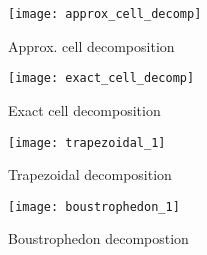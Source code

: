 \begin{figure}[t] 
  \label{fig:cellDec_typess} 
  \begin{minipage}[b]{0.5\linewidth}
    \centering
    \texttt{[image: approx\_cell\_decomp]}
    \caption{Approx. cell decomposition}
    \label{fig:cellDec_pic1}
    \vspace{4ex}
  \end{minipage}
  \begin{minipage}[b]{0.5\linewidth}
    \centering
    \texttt{[image: exact\_cell\_decomp]}
    \caption{Exact cell decomposition}
    \label{fig:cellDec_pic2}
    \vspace{4ex}%
  \end{minipage}
  \begin{minipage}[b]{0.5\linewidth}
    \centering
    \texttt{[image: trapezoidal\_1]}
    \caption{Trapezoidal decomposition} 
    \label{fig:cellDec_pic3}
    \vspace{4ex}
  \end{minipage}
  \begin{minipage}[b]{0.5\linewidth}
    \centering
    \texttt{[image: boustrophedon\_1]}
    \caption{Boustrophedon decompostion}
    \label{fig:cellDec_pic4}
    \vspace{4ex}%
  \end{minipage} 
\end{figure}